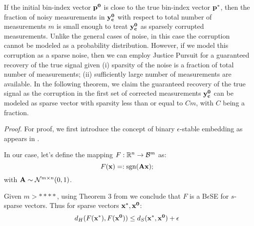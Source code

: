 If the initial bin-index vector $\mathbf{p^0}$ is close to the true bin-index vector $\mathbf{p^*}$, then the fraction of noisy measurements in $\mathbf{y^0_c}$ with respect to total number of measurements $m$ is small enough to treat $\mathbf{y^0_c}$ as sparsely corrupted measurements. Unlike the general cases of noise, in this case the corruption cannot be modeled as a probability distribution. However, if we model this corruption as a sparse noise, then we can employ Justice Pursuit for a guaranteed recovery of the true signal given (i) sparsity of the noise is a fraction of total number of measurements; (ii) sufficiently large number of measurements are available. In the following theorem, we claim the guaranteed recovery of the true signal as the corruption in the first set of corrected measurements $\mathbf{y_c^0}$ can be modeled as sparse vector with sparsity less than or equal to $Cm$, with $C$ being a fraction. 

\textit{Proof.} For proof, we first introduce the concept of binary $\epsilon$-stable embedding as appears in .
 
In our case, let's define the mapping $F: {\mathbb{R}}^n \rightarrow \mathcal{B}^m$  as:
$$
F(\mathbf{x})=: \mathrm{sgn}(\mathbf{Ax});
$$
with $\mathbf{A} \sim \mathcal{N}^{m \times n}(0,1)$.

Given $m > ****$, using Theorem 3 from  we conclude that $F$ is a B$\epsilon$SE for $s$-sparse vectors.
Thus for sparse vectors $\mathbf{x^*, x^0}$:
$$
d_H(F\mathbf{(x^*)},F\mathbf{(x^0)}) \leq d_S(\mathbf{x^*,x^0}) + \epsilon
$$


